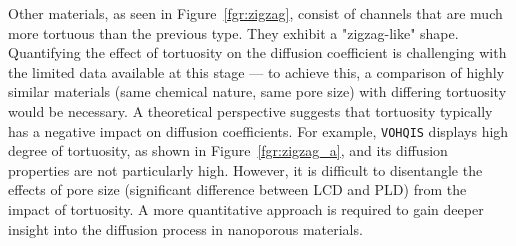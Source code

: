 \documentclass[main]{subfiles}
\begin{document}
Other materials, as seen in Figure~\ref{fgr:zigzag}, consist of channels that are much more tortuous than the previous type. They exhibit a "zigzag-like" shape. Quantifying the effect of tortuosity on the diffusion coefficient is challenging with the limited data available at this stage --- to achieve this, a comparison of highly similar materials (same chemical nature, same pore size) with differing tortuosity would be necessary. A theoretical perspective suggests that tortuosity typically has a negative impact on diffusion coefficients. For example, \texttt{VOHQIS} displays high degree of tortuosity, as shown in Figure~\ref{fgr:zigzag_a}, and its diffusion properties are not particularly high. However, it is difficult to disentangle the effects of pore size (significant difference between LCD and PLD) from the impact of tortuosity. A more quantitative approach is required to gain deeper insight into the diffusion process in nanoporous materials. 
\end{document}
